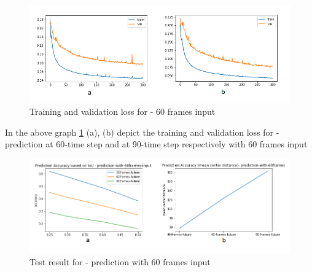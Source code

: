 \begin{figure}[H] 
\includegraphics[scale=0.8]{Phase3-training}
\begin{center}
\caption{Training and validation loss for - 60 frames input}
\label{fig:Phase3-training}
\end{center}
\end{figure}

In the above graph \ref{fig:Phase3-training} (a), (b) depict the training and validation loss for - prediction at 60-time step and at 90-time step respectively with 60 frames input \\




\begin{figure}[H] 
\includegraphics[scale=0.8]{Phase3-accuracy}
\begin{center}
\caption{Test result for - prediction with 60 frames input}
\label{Phase3-accuracy}
\end{center}
\end{figure}

